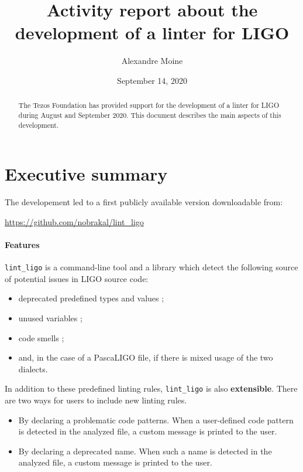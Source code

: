 \documentclass[10pt,a4paper]{article}
\author{Alexandre Moine}
\title{Activity report about the development of a linter for LIGO}
\date{September 14, 2020}
\begin{document}
\maketitle

\begin{abstract}
  The Tezos Foundation has provided support for the
  development of a linter for LIGO during August and September
  2020. This document describes the main aspects of this development.
\end{abstract}

\section{Executive summary}

The developement led to a first publicly available version downloadable from:
\begin{center}
  \url{https://github.com/nobrakal/lint\_ligo}
\end{center}


\paragraph{Features}

\verb|lint_ligo| is a command-line tool and a library which detect
the following source of potential issues in LIGO source code:

\begin{itemize}
\item deprecated predefined types and values ;
\item unused variables ;
\item code smells ;
\item and, in the case of a PascaLIGO file, if there is mixed usage of the two dialects.
\end{itemize}

In addition to these predefined linting rules, \verb!lint_ligo! is
also \textbf{extensible}. There are two ways for users to include new
linting rules.

\begin{itemize}
\item
  By declaring a problematic code patterns. When a user-defined code pattern is detected in
  the analyzed file, a custom message is printed to the user.

\item
  By declaring a deprecated name. When such a name is detected
  in the analyzed file, a custom message is printed to the user.
\end{itemize}
\end{document}
